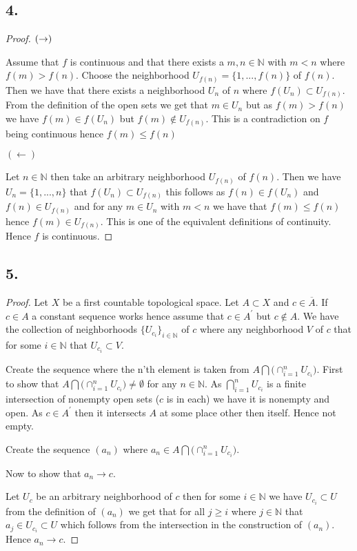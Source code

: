 \documentclass{amsart}
\theoremstyle{plain}
\theoremstyle{definition}
\theoremstyle{remark}
\begin{document}
\subsection*{4.}
\begin{proof}


    $\\ (\rightarrow)$


    Assume that $f$ is continuous and that there exists a $m,n\in \mathbb{N}$ with $m<n$ where $f(m)> f(n)$. Choose the neighborhood $U_{f(n)}=\{1,...,f(n)\}$ of $f(n)$. Then we have that there exists a neighborhood $U_n$ of $n$ where $f(U_n)\subset U_{f(n)}$. From the definition of the open sets we get that $m\in U_n$ but as $f(m)> f(n)$ we have $f(m)\in f(U_n)$ but $f(m)\not \in U_{f(n)}$. This is a contradiction on $f$ being continuous hence $f(m)\leq f(n)$

    $(\leftarrow)$


    Let $n\in \mathbb{N}$ then take an arbitrary neighborhood $U_{f(n)}$ of $f(n)$. Then we have $U_{n}=\{1,...,n\}$ that $f(U_n)\subset U_{f(n)}$ this follows as $f(n)\in f(U_n)$ and $f(n)\in U_{f(n)}$ and for any $m\in U_n$ with $m<n$ we have that $f(m)\leq f(n)$ hence $f(m)\in U_{f(n)}$. This is one of the equivalent definitions of continuity. Hence $f$ is continuous.
\end{proof}


\subsection*{5.}

\begin{proof}
    
    Let $X$ be a first countable topological space. Let $A\subset X$ and $c\in \overline A$. If $c\in A$ a constant sequence works hence assume that $c\in A^\prime$ but $c\not \in A$. We have the collection of neighborhoods $\{U_{c_i}\}_{i\in \mathbb{N}}$ of $c$ where any neighborhood $V$ of $c$ that for some $i\in \mathbb{N}$ that $U_{c_i}\subset V$.

    Create the sequence where the n'th element is taken from $A\bigcap \big(\cap_{i=1}^n U_{c_i} \big)$. First to show that $A\bigcap \big(\cap_{i=1}^n U_{c_i} \big)\not = \emptyset$ for any $n\in \mathbb{N}$. As $\bigcap_{i=1}^nU_{c_i}$ is a finite intersection of nonempty open sets  ($c$ is in each) we have it is nonempty and open. As $c\in A^\prime$  then it intersects $A$ at some place other then itself. Hence not empty. 

    Create the sequence $(a_n)$ where $a_n \in A\bigcap \big( \cap _{i=1}^n U_{c_i}\big)$. 

    Now to show that $a_n\to c$. 

    Let $U_c$ be an arbitrary neighborhood of $c$ then for some $i\in \mathbb{N}$ we have $U_{c_i}\subset U$ from the definition of $(a_n)$ we get that for all $j\geq i$ where $j\in \mathbb{N}$ that $a_j\in U_{c_i}\subset U$ which follows from the intersection in the construction of $(a_n)$. Hence $a_n\to c$.
\end{proof}
\end{document}
